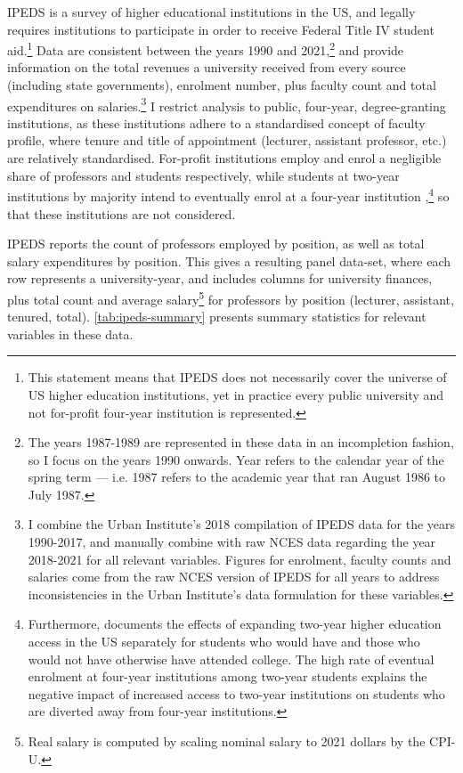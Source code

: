 \documentclass[notitlepage,12pt]{article}
\begin{document}
IPEDS is a survey of higher educational institutions in the US, and legally requires institutions to participate in order to receive Federal Title IV student aid.\footnote{
    This statement means that IPEDS does not necessarily cover the universe of US higher education institutions, yet in practice every public university and not for-profit four-year institution is represented.
}
Data are consistent between the years 1990 and 2021,\footnote{
    The years 1987-1989 are represented in these data in an incompletion fashion, so I focus on the years 1990 onwards.
    Year refers to the calendar year of the spring term --- i.e. 1987 refers to the academic year that ran August 1986 to July 1987.
}
and provide information on the total revenues a university received from every source (including state governments), enrolment number, plus faculty count and total expenditures on salaries.\footnote{
    I combine the Urban Institute's 2018 compilation of IPEDS data for the years 1990-2017, and manually combine with raw NCES data regarding the year 2018-2021 for all relevant variables.
    Figures for enrolment, faculty counts and salaries come from the raw NCES version of IPEDS for all years to address inconsistencies in the Urban Institute's data formulation for these variables.
}
I restrict analysis to public, four-year, degree-granting institutions, as these institutions adhere to a standardised concept of faculty profile, where tenure and title of appointment (lecturer, assistant professor, etc.) are relatively standardised.
For-profit institutions employ and enrol a negligible share of professors and students respectively, while students at two-year institutions by majority intend to eventually enrol at a four-year institution \citep{mountjoy2022},\footnote{
    Furthermore, \cite{mountjoy2022} documents the effects of expanding two-year higher education access in the US separately for students who would have and those who would not have otherwise have attended college.
    The high rate of eventual enrolment at four-year institutions among two-year students explains the negative impact of increased access to two-year institutions on students who are diverted away from four-year institutions.
}
so that these institutions are not considered.

IPEDS reports the count of professors employed by position, as well as total salary expenditures by position.
This gives a resulting panel data-set, where each row represents a university-year, and includes columns for university finances, plus total count and average salary\footnote{
    Real salary is computed by scaling nominal salary to 2021 dollars by the CPI-U.
} for professors by position (lecturer, assistant, tenured, total).
\autoref{tab:ipeds-summary} presents summary statistics for relevant variables in these data.
\end{document}
